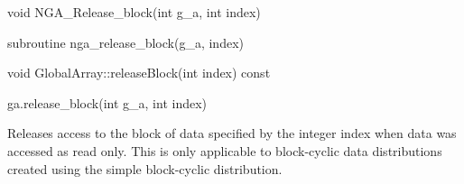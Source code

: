 \documentclass[12pt]{article}
\begin{document}


\begin{capi}
\begin{ccode}
void NGA_Release_block(int g_a, int index)
\end{ccode}
\begin{funcargs}
\end{funcargs}
\end{capi}

\begin{fapi}
\begin{fcode}
subroutine nga_release_block(g_a, index)
\end{fcode}
\begin{funcargs}
\end{funcargs}
\end{fapi}

\begin{cxxapi}
\begin{cxxcode}
void GlobalArray::releaseBlock(int index) const
\end{cxxcode}
\begin{funcargs}
\end{funcargs}
\end{cxxapi}

\begin{pyapi}
\begin{pycode}
ga.release_block(int g_a, int index)
\end{pycode}
\begin{funcargs}
\end{funcargs}
\end{pyapi}

\local

\begin{desc}

Releases access to the block of data specified by the integer index when data
was accessed as read only. This is only applicable to block-cyclic data
distributions created using the simple block-cyclic distribution.

\end{desc}


\end{document}
